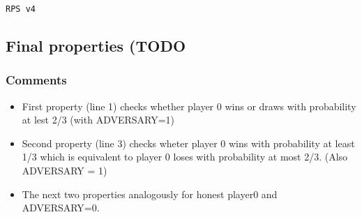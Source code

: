 %
\begin{lstlisting}[caption=RPS v4, label=lst:rps_v4]
RPS v4
\end{lstlisting}

\subsection{Final properties (TODO}



\subsubsection{Comments}

\begin{itemize}
\item First property (line 1) checks whether player 0 wins or draws with probability at lest 2/3 (with ADVERSARY=1)
\item Second property (line 3) checks wheter player 0 wins with probability at least 1/3 which is equivalent to player 0
loses with probability at most 2/3. (Also ADVERSARY = 1)
\item The next two properties analogously for honest player0 and ADVERSARY=0.
\end{itemize}

